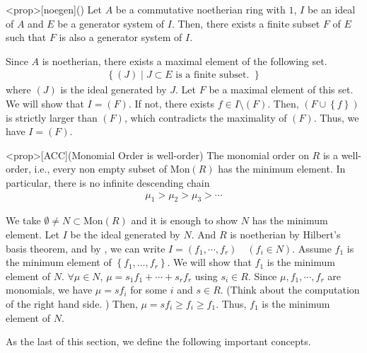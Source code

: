 \documentclass{article}
\renewcommand{\mid}{\middle|}
\begin{document}
\begin{statementsp}<prop>[noegen]()
    Let $A$ be a commutative noetherian ring with $1$, $I$ be an ideal of $A$ and $E$ be a generator system of $I$. Then, there exists a finite subset $F$ of $E$ such that $F$ is also a generator system of $I$.
\end{statementsp}
\begin{pfsp}
    Since $A$ is noetherian, there exists a maximal element of the following set. 
    \begin{align}
        \left\{ (J) \mid J \subset E \text{ is a finite subset. } \right\}
    \end{align}
    where $(J)$ is the ideal generated by $J$. Let $F$ be a maximal element of this set. We will show that $I = (F)$. If not, there exists $f \in I \setminus (F)$. Then, $(F \cup \left\{ f \right\})$ is strictly larger than $(F)$, which contradicts the maximality of $(F)$. Thus, we have $I = (F)$.
\end{pfsp}

\begin{statementsp}<prop>[ACC](Monomial Order is well-order)
    The monomial order on $R$ is a well-order, i.e., every non empty subset of $\mathrm{Mon}(R)$ has the minimum element. In particular, there is no infinite descending chain
    \begin{align}
        \mu_1 > \mu_2 > \mu_3 > \cdots
    \end{align}
\end{statementsp}
\begin{pfsp}
    We take $\emptyset \neq N \subset \mathrm{Mon}(R)$ and it is enough to show $N$ has the minimum element. Let $I$ be the ideal generated by $N$. And $R$ is noetherian by Hilbert's basis theorem, and by , we can write $I = (f_1, \cdots, f_r) \quad (f_i \in N)$. Assume $f_1$ is the minimum element of $\left\{ f_1, \ldots, f_r \right\}$. We will show that $f_1$ is the minimum element of $N$. $\forall \mu \in N$, $\mu = s_1 f_1 + \cdots + s_r f_r$ using $s_i \in R$. Since $\mu, f_1, \cdots, f_r$ are monomials, we have $\mu = s f_i$ for some $i$ and $s \in R$. (Think about the computation of the right hand side. ) Then, $\mu = s f_i \geq f_i \geq f_1$. Thus, $f_1$ is the minimum element of $N$.
\end{pfsp}

As the last of this section, we define the following important concepts.
\end{document}
